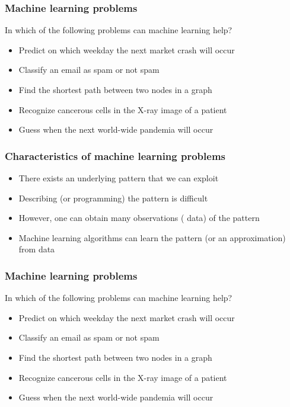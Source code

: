 \documentclass[10pt]{beamer}
\begin{document}
\begin{frame}
  \frametitle{Machine learning problems}

  In which of the following problems can machine learning help?
  \begin{itemize}
	\item Predict on which weekday the next market crash will occur
	\item Classify an email as spam or not spam
	\item Find the shortest path between two nodes in a graph
	\item Recognize cancerous cells in the X-ray image of a patient
	\item Guess when the next world-wide pandemia will occur
  \end{itemize}
\end{frame}

\begin{frame}
  \frametitle{Characteristics of machine learning problems}

  \begin{itemize}
	\item There exists an underlying {\color{red} pattern} that we can exploit
	\item Describing (or programming) the pattern is difficult
	\item However, one can obtain many {\color{green} observations} ({\color{green} data}) of the pattern
	\item Machine learning algorithms can {\color{blue} learn} the pattern (or an approximation) from data
  \end{itemize}
\end{frame}

\begin{frame}
  \frametitle{Machine learning problems}

  In which of the following problems can machine learning help?
  \begin{itemize}
	\item Predict on which weekday the next market crash will occur
	\item {\color{green} Classify an email as spam or not spam}
	\item Find the shortest path between two nodes in a graph
	\item {\color{green} Recognize cancerous cells in the X-ray image of a patient}
	\item Guess when the next world-wide pandemia will occur
  \end{itemize}
\end{frame}
\end{document}
